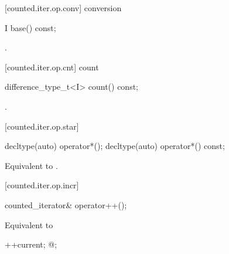 \begin{addedblock}
\begin{itemdescr}
\end{itemdescr}

[counted.iter.op.conv]{ conversion}

%
%
\begin{itemdecl}
I base() const;
\end{itemdecl}

\begin{itemdescr}
\pnum
\returns {}.
\end{itemdescr}

[counted.iter.op.cnt]{ count}

%
%
\begin{itemdecl}
difference_type_t<I> count() const;
\end{itemdecl}

\begin{itemdescr}
\pnum
\returns {}.
\end{itemdescr}

[counted.iter.op.star]{}

%
%
\begin{itemdecl}
decltype(auto) operator*();
decltype(auto) operator*() const;
\end{itemdecl}

\begin{itemdescr}
\pnum
\effects Equivalent to
.
\end{itemdescr}

[counted.iter.op.incr]{}

%
%
\begin{itemdecl}
counted_iterator& operator++();
\end{itemdecl}

\begin{itemdescr}
\pnum
\requires {}

\pnum
\effects Equivalent to
\begin{codeblock}
++current;
@\dcr@cnt;
\end{codeblock}


\end{itemdescr}
\end{addedblock}
